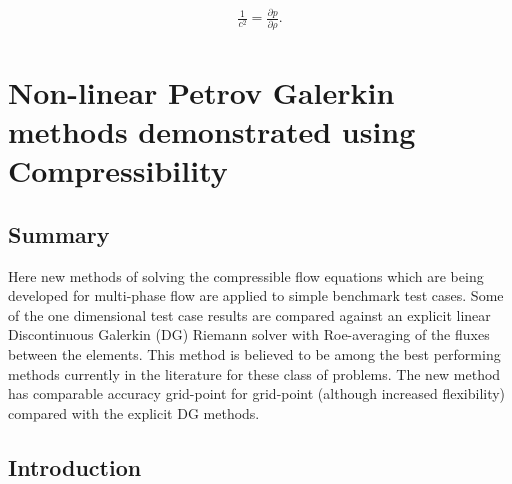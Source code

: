 \begin{eqnarray}
\frac{1}{c^2} = \frac{\partial p}{\partial \rho}.
\label{c-def}
\end{eqnarray}











\vfill\eject



\section{Non-linear Petrov Galerkin methods demonstrated using Compressibility}










\subsection{Summary}
Here new methods of solving the compressible flow equations
which are being developed for multi-phase flow are
applied to simple benchmark test cases. Some of the one dimensional
test case results are compared against an explicit linear Discontinuous
Galerkin (DG) Riemann solver with Roe-averaging of
the fluxes between the elements.
This method
is believed to be among the best performing methods
currently in the literature for these class of problems.
The new method has comparable accuracy grid-point for grid-point
(although
increased flexibility) compared with the explicit DG methods.



\subsection{Introduction}

